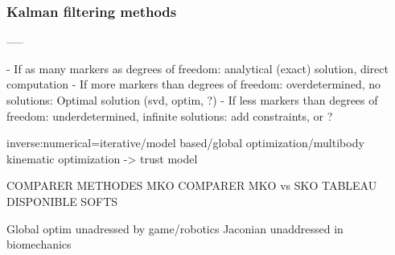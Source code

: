 \subsubsection{Kalman filtering methods}




-----




- If as many markers as degrees of freedom: analytical (exact) solution, direct computation
- If more markers than degrees of freedom: overdetermined, no solutions: Optimal solution (svd, optim, ?)
- If less markers than degrees of freedom: underdetermined, infinite solutions: add constraints, or ?



inverse:numerical=iterative/model based/global optimization/multibody kinematic optimization
-> trust model


COMPARER METHODES MKO
COMPARER MKO vs SKO
TABLEAU DISPONIBLE SOFTS


Global optim unadressed by game/robotics
Jaconian unaddressed in biomechanics





